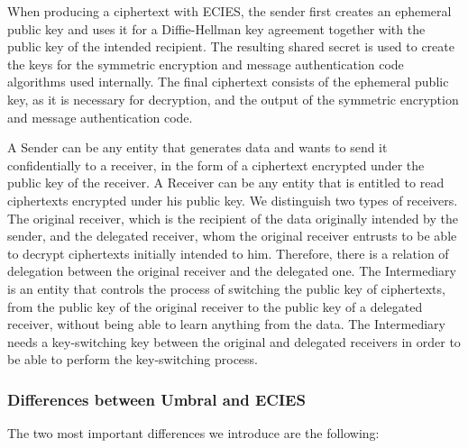 \documentclass{amsart}
\begin{document}
When producing a ciphertext with ECIES, the sender first creates an ephemeral public key and uses it for a Diffie-Hellman key agreement together with the public key of the intended recipient. The resulting shared secret is used to create the keys for the symmetric encryption and message authentication code algorithms used internally. The final ciphertext consists of the ephemeral public key, as it is necessary for decryption, and the output of the symmetric encryption and message authentication code.

A Sender can  be any entity that generates data and wants to send it confidentially to a receiver, in the form of a ciphertext encrypted under the public key of the receiver. 
%
A Receiver can be any entity that is entitled to read ciphertexts encrypted under his public key. We distinguish two types of receivers. The original receiver, which is the recipient of the data originally intended by the sender, and the delegated receiver, whom the original receiver entrusts to be able to decrypt ciphertexts initially intended to him. Therefore, there is a relation of delegation between the original receiver and the delegated one. 
% 
The Intermediary is an entity that controls the process of switching the public key of ciphertexts, from the public key of the original receiver to the public key of a delegated receiver, without being able to learn anything from the data. The Intermediary needs a key-switching key between the original and delegated receivers in order to be able to perform the key-switching process.


\subsubsection{Differences between Umbral and ECIES}

The two most important differences we introduce are the following:
\end{document}
